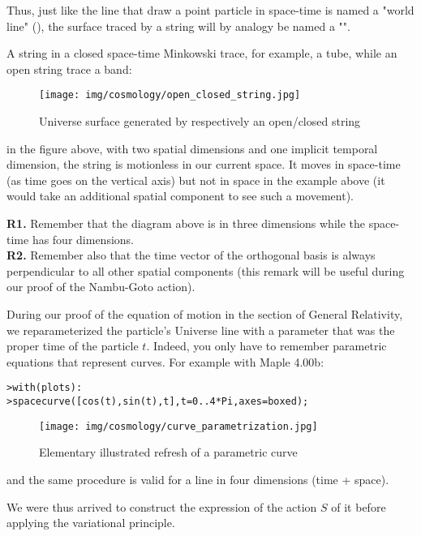 	Thus, just like the line that draw a point particle in space-time is named a "world line" (), the surface traced by a string will by analogy be named a "".
	
	A string in a closed space-time Minkowski trace, for example, a tube, while an open string trace a band:
	\begin{figure}[H]
		\centering
		\texttt{[image: img/cosmology/open\_closed\_string.jpg]}	
		\caption{Universe surface generated by respectively an open/closed string}
	\end{figure}
	in the figure above, with two spatial dimensions and one implicit temporal dimension, the string is motionless in our current space. It moves in space-time (as time goes on the vertical axis) but not in space in the example above (it would take an additional spatial component to see such a movement).
	\begin{tcolorbox}[title=Remarks,colframe=black,arc=10pt]
	\textbf{R1.} Remember that the diagram above is in three dimensions while the space-time has four dimensions.\\
	
	\textbf{R2.} Remember also that the time vector of the orthogonal basis is always perpendicular to all other spatial components (this remark will be useful during our proof of the Nambu-Goto action).
	\end{tcolorbox}
	
	During our proof of the equation of motion in the section of General Relativity, we reparameterized the particle's Universe line with a parameter that was the proper time of the particle $t$. Indeed, you only have to remember parametric equations that represent curves. For example with Maple 4.00b:
	
	\texttt{>with(plots):}\\
	\texttt{>spacecurve([cos(t),sin(t),t],t=0..4*Pi,axes=boxed);}
	
	\begin{figure}[H]
		\centering
		\texttt{[image: img/cosmology/curve\_parametrization.jpg]}	
		\caption{Elementary illustrated refresh of a parametric curve}
	\end{figure}
	and the same procedure is valid for a line in four dimensions (time + space).
	
	We were thus arrived to construct the expression of the action $S$ of it before applying the variational principle.
	
